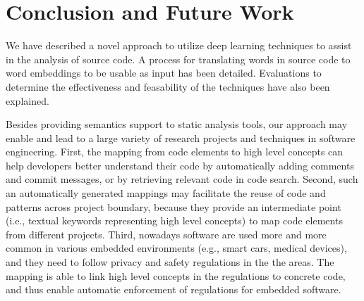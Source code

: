 \section{Conclusion and Future Work}

We have described a novel approach to utilize deep learning techniques to assist in the analysis of source code. A process for translating words in source code to word embeddings to be usable as input has been detailed. Evaluations to determine the effectiveness and feasability of the techniques have also been explained.

Besides providing semantics support to static analysis tools, our approach may enable and lead to a large variety of research projects and techniques in software engineering. First, the mapping from code elements to high level concepts can help developers better understand their code by automatically adding comments and commit messages, or by retrieving relevant code in code search. Second, such an automatically generated mappings may facilitate the reuse of code and patterns across project boundary, because they provide an intermediate point (i.e., textual keywords representing high level concepts) to map code elements from different projects. Third, nowadays software are used more and more common in various embedded environments (e.g., smart cars, medical devices), and they need to follow privacy and safety regulations in the the areas. The mapping is able to link high level concepts in the regulations to concrete code, and thus enable automatic enforcement of regulations for embedded software. 




